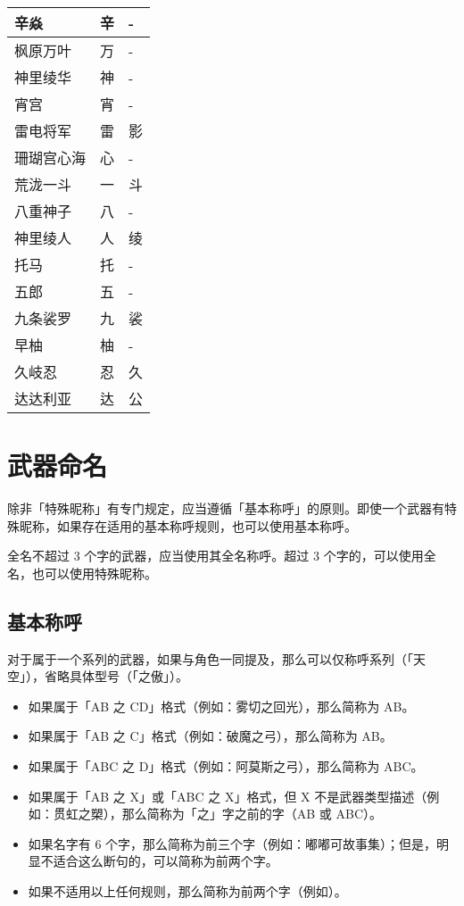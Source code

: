 \begin{longtabu}{|X[2c]|X[c]|X[c]|}
	{辛焱} & {辛} & {-} \\
	\hline
	{枫原万叶} & {万} & {-} \\
	{神里绫华} & {神} & {-} \\
	{宵宫} & {宵} & {-} \\
	{雷电将军} & {雷} & {影} \\
	{珊瑚宫心海} & {心} & {-} \\
	{荒泷一斗} & {一} & {斗} \\
	{八重神子} & {八} & {-} \\
	{神里绫人} & {人} & {绫} \\
	\hline
	{托马} & {托} & {-} \\
	{五郎} & {五} & {-} \\
	{九条裟罗} & {九} & {裟} \\
	{早柚} & {柚} & {-} \\
	{久岐忍} & {忍} & {久} \\
	\hline
	{达达利亚} & {达} & {公} \\
\end{longtabu}




\section{武器命名}

除非「特殊昵称」有专门规定，应当遵循「基本称呼」的原则。即使一个武器有特殊昵称，如果存在适用的基本称呼规则，也可以使用基本称呼。

全名不超过 3 个字的武器，应当使用其全名称呼。超过 3 个字的，可以使用全名，也可以使用特殊昵称。

\subsection{基本称呼}

对于属于一个系列的武器，如果与角色一同提及，那么可以仅称呼系列（「天空」），省略具体型号（「之傲」）。

\begin{itemize}
	\item 如果属于「AB 之 CD」格式（例如：雾切之回光），那么简称为 AB。
	\item 如果属于「AB 之 C」格式（例如：破魔之弓），那么简称为 AB。
	\item 如果属于「ABC 之 D」格式（例如：阿莫斯之弓），那么简称为 ABC。
	\item 如果属于「AB 之 X」或「ABC 之 X」格式，但 X 不是武器类型描述（例如：贯虹之槊），那么简称为「之」字之前的字（AB 或 ABC）。
	\item 如果名字有 6 个字，那么简称为前三个字（例如：嘟嘟可故事集）；但是，明显不适合这么断句的，可以简称为前两个字。
	\item 如果不适用以上任何规则，那么简称为前两个字（例如）。
\end{itemize}

